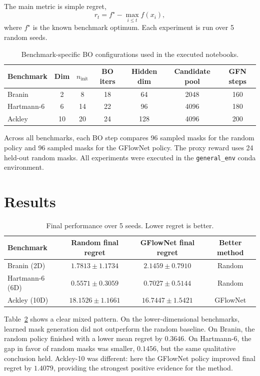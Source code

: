 \documentclass{article}
\begin{document}
The main metric is simple regret,
\[
r_t = f^\star - \max_{i \le t} f(x_i),
\]
where $f^\star$ is the known benchmark optimum. Each experiment is run over 5 random seeds.

\begin{table}[t]
\centering
\caption{Benchmark-specific BO configurations used in the executed notebooks.}
\label{tab:configs}
\small
\begin{tabular}{lcccccc}
\toprule
Benchmark & Dim & $n_{\text{init}}$ & BO iters & Hidden dim & Candidate pool & GFN steps \\
\midrule
Branin & 2 & 8 & 18 & 64 & 2048 & 160 \\
Hartmann-6 & 6 & 14 & 22 & 96 & 4096 & 180 \\
Ackley & 10 & 20 & 24 & 128 & 4096 & 200 \\
\bottomrule
\end{tabular}
\end{table}

Across all benchmarks, each BO step compares 96 sampled masks for the random policy and 96 sampled masks for the GFlowNet policy. The proxy reward uses 24 held-out random masks. All experiments were executed in the \texttt{general\_env} conda environment.

\section{Results}

\begin{table}[t]
\centering
\caption{Final performance over 5 seeds. Lower regret is better.}
\label{tab:final_results}
\small
\begin{tabular}{lccc}
\toprule
Benchmark & Random final regret & GFlowNet final regret & Better method \\
\midrule
Branin (2D) & $1.7813 \pm 1.1734$ & $2.1459 \pm 0.7910$ & Random \\
Hartmann-6 (6D) & $0.5571 \pm 0.3059$ & $0.7027 \pm 0.5144$ & Random \\
Ackley (10D) & $18.1526 \pm 1.1661$ & $16.7447 \pm 1.5421$ & GFlowNet \\
\bottomrule
\end{tabular}
\end{table}

Table~\ref{tab:final_results} shows a clear mixed pattern. On the lower-dimensional benchmarks, learned mask generation did not outperform the random baseline. On Branin, the random policy finished with a lower mean regret by $0.3646$. On Hartmann-6, the gap in favor of random masks was smaller, $0.1456$, but the same qualitative conclusion held. Ackley-10 was different: here the GFlowNet policy improved final regret by $1.4079$, providing the strongest positive evidence for the method.
\end{document}
